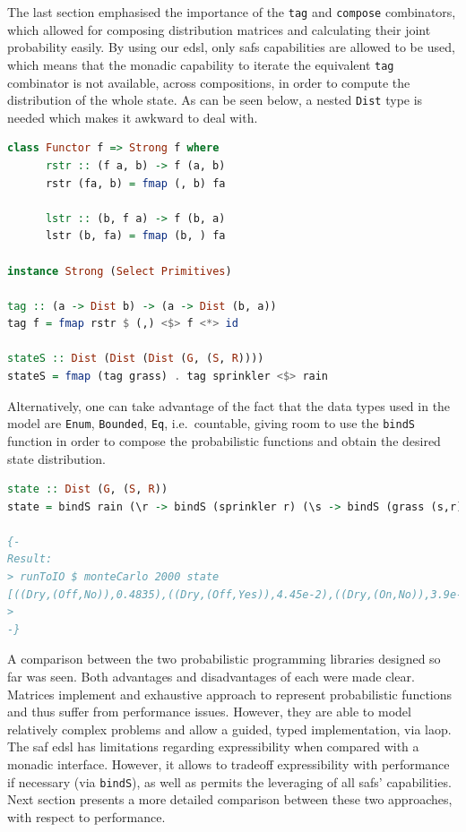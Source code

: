 \documentclass[
  oneside,
  11pt, a4paper,
  footinclude=true,
  headinclude=true,
  cleardoublepage=empty
]{scrbook}
\theoremstyle{definition}
\theoremstyle{definition}
\begin{document}
        The last section emphasised the importance of the \texttt{tag} and \texttt{compose} combinators, which  allowed for composing distribution matrices and calculating their joint probability easily. By using our \gls{edsl}, only \glspl{saf} capabilities are allowed to be used, which means that the monadic capability to iterate the equivalent \texttt{tag} combinator is not available, across compositions, in order to compute the distribution of the whole state. As can be seen below, a nested \texttt{Dist} type is needed which makes it awkward to deal with.
        
        \begin{lstlisting}[language=Haskell, caption={\texttt{tag} combinator}, captionpos=b]
class Functor f => Strong f where
      rstr :: (f a, b) -> f (a, b)
      rstr (fa, b) = fmap (, b) fa

      lstr :: (b, f a) -> f (b, a)
      lstr (b, fa) = fmap (b, ) fa

instance Strong (Select Primitives)
 
tag :: (a -> Dist b) -> (a -> Dist (b, a))
tag f = fmap rstr $ (,) <$> f <*> id

stateS :: Dist (Dist (Dist (G, (S, R))))
stateS = fmap (tag grass) . tag sprinkler <$> rain
        \end{lstlisting}{}
        
        Alternatively, one can take advantage of the fact that the data types used in the model are \texttt{Enum}, \texttt{Bounded}, \texttt{Eq}, i.e.\ countable, giving room to use the \texttt{bindS} function in order to compose the probabilistic functions and obtain the desired state distribution.
        
        \begin{lstlisting}[language=Haskell, caption={State distribution}, captionpos=b]
state :: Dist (G, (S, R))
state = bindS rain (\r -> bindS (sprinkler r) (\s -> bindS (grass (s,r)) (\g -> pure (g, (s,r)))))

{-
Result:
> runToIO $ monteCarlo 2000 state
[((Dry,(Off,No)),0.4835),((Dry,(Off,Yes)),4.45e-2),((Dry,(On,No)),3.9e-2),((Wet,(Off,Yes)),0.151),((Wet,(On,No)),0.28),((Wet,(On,Yes)),2.0e-3)]
>
-}
        \end{lstlisting}{}
        
        A comparison between the two probabilistic programming libraries designed so far was seen. Both advantages and disadvantages of each were made clear. Matrices implement and exhaustive approach to represent probabilistic functions and thus suffer from performance issues. However, they are able to model relatively complex problems and allow a guided, typed implementation, via \gls{laop}. The \gls{saf} \gls{edsl} has limitations regarding expressibility when compared with a monadic interface. However, it allows to tradeoff expressibility with performance if necessary (via \texttt{bindS}), as well as permits the leveraging of all \glspl{saf}' capabilities. Next section presents a more detailed comparison between these two approaches, with respect to performance.
        
\end{document}

